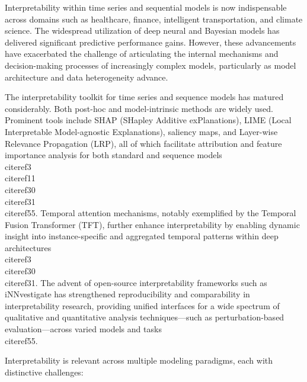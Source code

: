 \documentclass[11pt]{article}
\begin{document}
Interpretability within time series and sequential models is now indispensable across domains such as healthcare, finance, intelligent transportation, and climate science. The widespread utilization of deep neural and Bayesian models has delivered significant predictive performance gains. However, these advancements have exacerbated the challenge of articulating the internal mechanisms and decision-making processes of increasingly complex models, particularly as model architecture and data heterogeneity advance.

The interpretability toolkit for time series and sequence models has matured considerably. Both post-hoc and model-intrinsic methods are widely used. Prominent tools include SHAP (SHapley Additive exPlanations), LIME (Local Interpretable Model-agnostic Explanations), saliency maps, and Layer-wise Relevance Propagation (LRP), all of which facilitate attribution and feature importance analysis for both standard and sequence models~\\cite{ref3}\\cite{ref11}\\cite{ref30}\\cite{ref31}\\cite{ref55}. Temporal attention mechanisms, notably exemplified by the Temporal Fusion Transformer (TFT), further enhance interpretability by enabling dynamic insight into instance-specific and aggregated temporal patterns within deep architectures~\\cite{ref3}\\cite{ref30}\\cite{ref31}. The advent of open-source interpretability frameworks such as iNNvestigate has strengthened reproducibility and comparability in interpretability research, providing unified interfaces for a wide spectrum of qualitative and quantitative analysis techniques—such as perturbation-based evaluation—across varied models and tasks~\\cite{ref55}.

Interpretability is relevant across multiple modeling paradigms, each with distinctive challenges:
\end{document}
